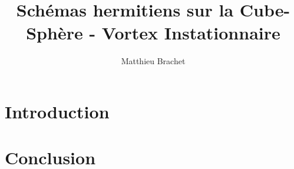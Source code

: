 \documentclass[10pt,a4paper]{article}
\title{Schémas hermitiens sur la Cube-Sphère - Vortex Instationnaire}
\author{Matthieu Brachet}
\begin{document}
\maketitle

\tableofcontents

\section*{Introduction}









\section*{Conclusion}
\end{document}

